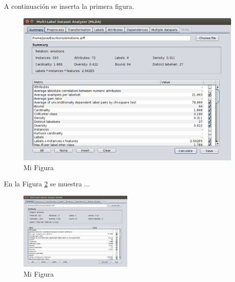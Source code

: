 \documentclass{article}
\begin{document}
A continuación se inserta la primera figura.

\begin{figure}[htbp]
  \centering
    \includegraphics{figs/fig1.png}
  \caption{Mi Figura}
  \label{fig:fig1}
\end{figure}

En la Figura \ref{fig:fig2} se muestra ...

\begin{figure}[htbp]
  \centering
    \includegraphics[width=0.5\textwidth]{figs/fig1.png}
  \caption{Mi Figura}
  \label{fig:fig2}
\end{figure}
\end{document}
